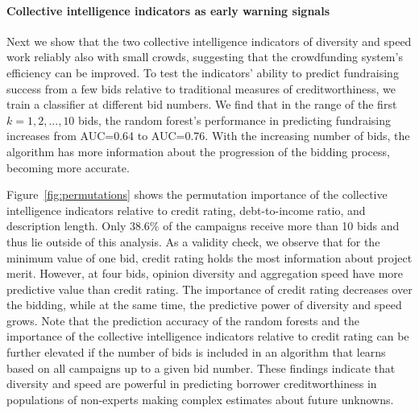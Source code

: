 \documentclass[sigconf]{acmart}
\begin{document}
\paragraph{Collective intelligence indicators as early warning signals} Next we show that the two collective intelligence indicators of diversity and speed work reliably also with small crowds, suggesting that the crowdfunding system’s efficiency can be improved. To test the indicators' ability to predict fundraising success from a few bids relative to traditional measures of creditworthiness, we train a classifier at different bid numbers. We find that in the range of the first $k={1,2,...,10}$ bids, the random forest's performance in predicting fundraising increases from AUC=0.64 to AUC=0.76. With the increasing number of bids, the algorithm has more information about the progression of the bidding process, becoming more accurate.

Figure~\ref{fig:permutations} shows the permutation importance of the collective intelligence indicators relative to credit rating, debt-to-income ratio, and description length. Only 38.6\% of the campaigns receive more than 10 bids and thus lie outside of this analysis. As a validity check, we observe that for the minimum value of one bid, credit rating holds the most information about project merit. However, at four bids, opinion diversity and aggregation speed have more predictive value than credit rating. The importance of credit rating decreases over the bidding, while at the same time, the predictive power of diversity and speed grows. Note that the prediction accuracy of the random forests and the importance of the collective intelligence indicators relative to credit rating can be further elevated if the number of bids is included in an algorithm that learns based on all campaigns up to a given bid number. These findings indicate that diversity and speed are powerful in predicting borrower creditworthiness in populations of non-experts making complex estimates about future unknowns.  
\end{document}
